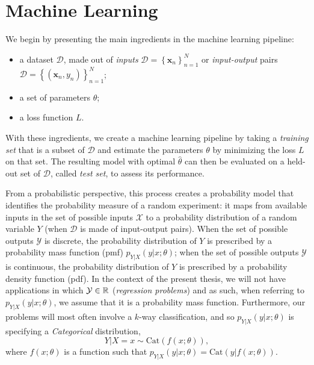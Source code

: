 \section{Machine Learning}
\label{sec:ml-primer}

\noindent We begin by presenting the main ingredients in the machine learning pipeline:
%
\begin{itemize}
    \item a dataset $\mathcal{D}$, made out of
          \textit{inputs} $\mathcal{D}=\left\{\bm{x}_n\right\}_{n=1}^N$ or
          \textit{input-output} pairs
          $\mathcal{D}=\left\{(\bm{x}_n,y_n)\right\}_{n=1}^N$;
    \item a set of parameters $\theta$;
    \item a loss function $L$.
\end{itemize}
%
With these ingredients, we create a machine learning pipeline by
taking a \textit{training set} that is a subset of $\mathcal{D}$ and estimate
the parameters $\theta$ by minimizing the loss
$L$ on that set. The resulting model with optimal
$\hat{\theta}$ can then be evaluated on a held-out set of
$\mathcal{D}$, called \textit{test set}, to assess its performance.

From a probabilistic perspective, this process creates a probability
model that identifies the probability measure of a random experiment:
it maps from available inputs in the set of possible inputs
$\mathcal{X}$ to a probability distribution of a random variable $Y$
(when $\mathcal D$ is made of input-output pairs). When the set of
possible outputs $\mathcal{Y}$ is discrete, the probability
distribution of $Y$ is prescribed by a probability mass function
(pmf) $p_{Y|X}(y|x;\theta)$; when the set of possible outputs
$\mathcal{Y}$ is continuous, the probability distribution of $Y$ is
prescribed by a probability density function (pdf). In the context of
the present thesis, we will not have applications in which
$\mathcal{Y}\in\mathbb{R}$ (\ie \textit{regression problems}) and as
such, when referring to $p_{Y|X}(y|x;\theta)$, we assume that it is a
probability mass function. Furthermore, our problems will most often
involve a $k$-way classification, and so $p_{Y|X}(y|x;\theta)$ is
specifying a \textit{Categorical} distribution,
%
\begin{equation}
    Y|X\!\!=\!x \sim \text{Cat}(f(x; \theta)),
\end{equation}
%
where $f(x; \theta)$ is a function such that
$p_{Y|X}(y|x;\theta)=\text{Cat}(y|f(x; \theta))$.

